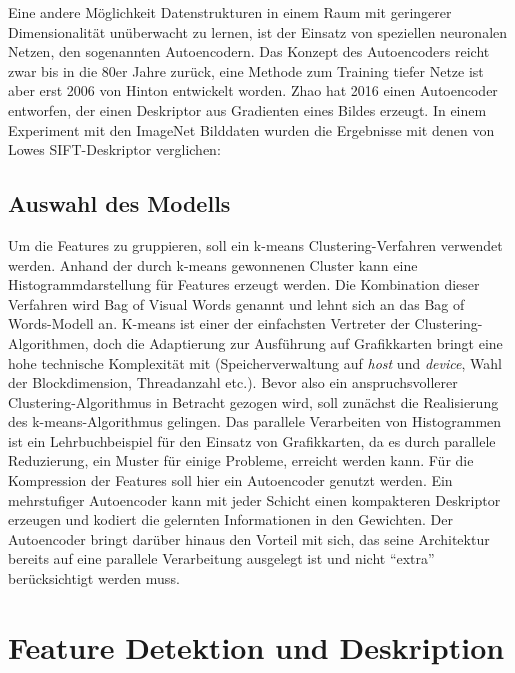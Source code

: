 
Eine andere Möglichkeit Datenstrukturen in einem Raum mit geringerer Dimensionalität unüberwacht zu lernen, ist der Einsatz von speziellen neuronalen Netzen, den sogenannten Autoencodern. Das Konzept des Autoencoders reicht zwar bis in die 80er Jahre zurück, eine Methode zum Training tiefer Netze ist aber erst 2006 von Hinton \cite{dae2006} entwickelt worden. Zhao \cite{aed2016} hat 2016 einen Autoencoder entworfen, der einen Deskriptor aus Gradienten eines Bildes erzeugt. In einem Experiment mit den ImageNet Bilddaten wurden die Ergebnisse mit denen von Lowes SIFT-Deskriptor verglichen: 

\subsection{Auswahl des Modells}

Um die Features zu gruppieren, soll ein k-means Clustering-Verfahren verwendet werden. Anhand der durch k-means gewonnenen Cluster kann eine Histogrammdarstellung für Features erzeugt werden. Die Kombination dieser Verfahren wird Bag of Visual Words genannt und lehnt sich an das Bag of Words-Modell an. K-means ist einer der einfachsten Vertreter der Clustering-Algorithmen, doch die Adaptierung zur Ausführung auf Grafikkarten bringt eine hohe technische Komplexität mit (Speicherverwaltung auf \textit{host} und \textit{device}, Wahl der Blockdimension, Threadanzahl etc.). Bevor also ein anspruchsvollerer Clustering-Algorithmus in Betracht gezogen wird, soll zunächst die Realisierung des k-means-Algorithmus gelingen. Das parallele Verarbeiten von Histogrammen ist ein Lehrbuchbeispiel für den Einsatz von Grafikkarten, da es durch parallele Reduzierung, ein Muster für einige Probleme, erreicht werden kann. \newline
Für die Kompression der Features soll hier ein Autoencoder genutzt werden. Ein mehrstufiger Autoencoder kann mit jeder Schicht einen kompakteren Deskriptor erzeugen und kodiert die gelernten Informationen in den Gewichten. Der Autoencoder bringt darüber hinaus den Vorteil mit sich, das seine Architektur bereits auf eine parallele Verarbeitung ausgelegt ist und nicht \enquote{extra} berücksichtigt werden muss.

\section{Feature Detektion und Deskription}
\label{extraction}

